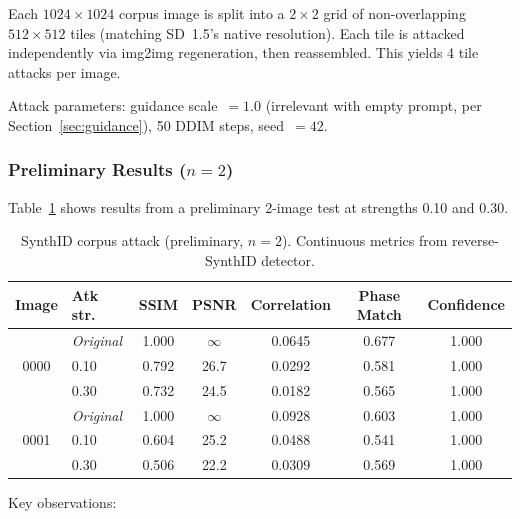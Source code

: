 \documentclass[11pt,a4paper]{article}
\begin{document}
Each $1024 \times 1024$ corpus image is split into a $2 \times 2$ grid of
non-overlapping $512 \times 512$ tiles (matching SD~1.5's native
resolution). Each tile is attacked independently via img2img regeneration,
then reassembled. This yields 4 tile attacks per image.

Attack parameters: guidance scale~$= 1.0$ (irrelevant with empty prompt,
per Section~\ref{sec:guidance}), 50 DDIM steps, seed~$= 42$.

\subsubsection{Preliminary Results ($n = 2$)}

Table~\ref{tab:synthid-corpus} shows results from a preliminary 2-image
test at strengths 0.10 and 0.30.

\begin{table}[h]
\centering
\caption{SynthID corpus attack (preliminary, $n = 2$). Continuous
metrics from reverse-SynthID detector.}
\label{tab:synthid-corpus}
\small
\begin{tabular}{clccccc}
\toprule
\textbf{Image} & \textbf{Atk str.} & \textbf{SSIM} & \textbf{PSNR} &
\textbf{Correlation} & \textbf{Phase Match} & \textbf{Confidence} \\
\midrule
\multirow{3}{*}{0000} & \textit{Original} & 1.000 & $\infty$ & 0.0645 & 0.677 & 1.000 \\
& 0.10 & 0.792 & 26.7 & 0.0292 & 0.581 & 1.000 \\
& 0.30 & 0.732 & 24.5 & 0.0182 & 0.565 & 1.000 \\
\midrule
\multirow{3}{*}{0001} & \textit{Original} & 1.000 & $\infty$ & 0.0928 & 0.603 & 1.000 \\
& 0.10 & 0.604 & 25.2 & 0.0488 & 0.541 & 1.000 \\
& 0.30 & 0.506 & 22.2 & 0.0309 & 0.569 & 1.000 \\
\bottomrule
\end{tabular}
\end{table}

Key observations:
\end{document}
